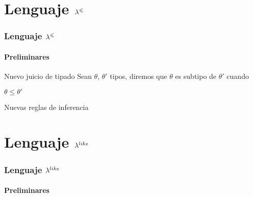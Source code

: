 \documentclass{beamer}
\begin{document}
\section{Lenguaje $\lambda^{\leqslant}$}

\begin{frame}
\frametitle{Lenguaje $\lambda^{\leqslant}$}
\framesubtitle{Preliminares}

\begin{block}{Nuevo juicio de tipado}
Sean $\theta$, $\theta'$ tipos, diremos que $\theta$ es subtipo de $\theta'$ cuando

\begin{center}
$\theta \leq \theta'$
\end{center}

\end{block}

\pause

\begin{block}{Nuevas reglas de inferencia}



\end{block}

\end{frame}

\section{Lenguaje $\lambda^{like}$}

\begin{frame}
\frametitle{Lenguaje $\lambda^{like}$}
\framesubtitle{Preliminares}

\begin{block}

\end{block}

\end{frame}
\end{document}
